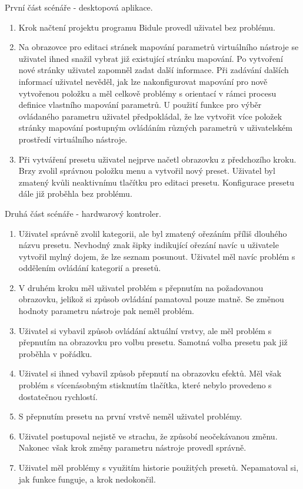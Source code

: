 \documentclass[thesis=M,czech]{FITthesis}[2019/03/06]
\begin{document}
				\noindent
				První část scénáře - desktopová aplikace.
				\begin{enumerate}
					\item Krok načtení projektu programu Bidule provedl uživatel bez problému.
					
					\item Na obrazovce pro editaci stránek mapování parametrů virtuálního nástroje se uživatel ihned snažil vybrat již existující stránku mapování. Po vytvoření nové stránky uživatel zapomněl zadat další informace. Při zadávání dalších informací uživatel nevěděl, jak lze nakonfigurovat mapování pro nově vytvořenou položku a měl celkově problémy s orientací v rámci procesu definice vlastního  mapování parametrů.	U použití funkce pro výběr ovládaného parametru uživatel předpokládal, že lze vytvořit více položek stránky mapování postupným ovládáním různých parametrů v uživatelském prostředí virtuálního nástroje.
					
					\item Při vytváření presetu uživatel nejprve načetl obrazovku z předchozího kroku. Brzy zvolil správnou položku menu a vytvořil nový preset. Uživatel byl zmatený kvůli neaktivnímu tlačítku pro editaci presetu. Konfigurace presetu dále již proběhla bez problému.
				\end{enumerate}
				
				\noindent
				Druhá část scénáře - hardwarový kontroler.
				\begin{enumerate}
					\item Uživatel správně zvolil kategorii, ale byl zmatený ořezáním příliš dlouhého názvu presetu. Nevhodný znak šipky indikující ořezání navíc u uživatele vytvořil mylný dojem, že lze seznam posunout. Uživatel měl navíc problém s oddělením ovládání kategorií a presetů.
					\item V druhém kroku měl uživatel problém s přepnutím na požadovanou obrazovku, jelikož si způsob ovládání pamatoval pouze matně. Se změnou hodnoty parametru nástroje pak neměl problém. 
					\item Uživatel si vybavil způsob ovládání aktuální vrstvy, ale měl problém s přepnutím na obrazovku pro volbu presetu. Samotná volba presetu pak již proběhla v pořádku.
					\item Uživatel si ihned vybavil způsob přepnutí na obrazovku efektů. Měl však problém s vícenásobným stisknutím tlačítka, které nebylo provedeno s dostatečnou rychlostí.
					\item S přepnutím presetu na první vrstvě neměl uživatel problémy.
					\item Uživatel postupoval nejistě ve strachu, že způsobí neočekávanou změnu. Nakonec však krok změny parametru nástroje provedl správně.
					\item Uživatel měl problémy s využitím historie použitých presetů. Nepamatoval si, jak funkce funguje, a krok nedokončil.
				\end{enumerate}
			
\end{document}
